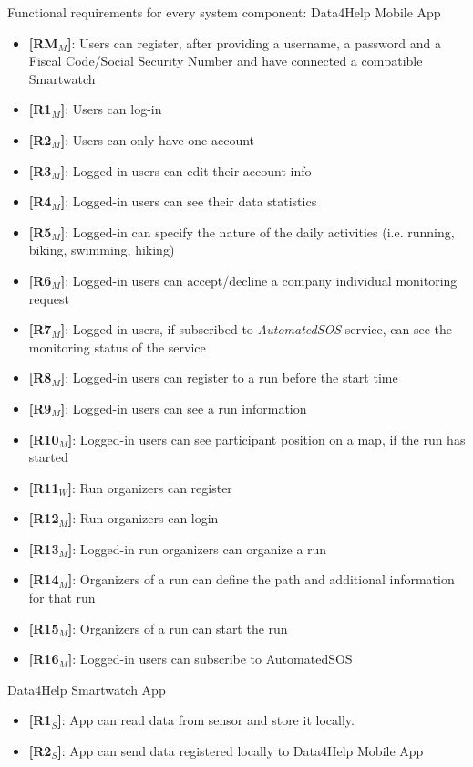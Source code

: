 Functional requirements for every system component:
\newline
Data4Help Mobile App
\begin{itemize}
    \item \textbf{[RM$_M$]}: Users can register, after providing a username, a password and a Fiscal Code/Social Security Number and have connected a compatible Smartwatch
    \item \textbf{[R1$_M$]}: Users can log-in
    \item \textbf{[R2$_M$]}: Users can only have one account 
    \item \textbf{[R3$_M$]}: Logged-in users can edit their account info
    \item \textbf{[R4$_M$]}: Logged-in users can see their data statistics
    \item \textbf{[R5$_M$]}: Logged-in can specify the nature of the daily activities (i.e. running, biking, swimming, hiking)
    \item \textbf{[R6$_M$]}: Logged-in users can accept/decline a company individual monitoring request
    \item \textbf{[R7$_M$]}: Logged-in users, if subscribed to \textit{AutomatedSOS} service, can see the monitoring status of the service
    \item \textbf{[R8$_M$]}: Logged-in users can register to a run before the start time
    \item \textbf{[R9$_M$]}: Logged-in users can see a run information
    \item \textbf{[R10$_M$]}: Logged-in users can see participant position on a map, if the run has started
        \item \textbf{[R11$_W$]}: Run organizers can register
    \item \textbf{[R12$_M$]}: Run organizers can login
    \item \textbf{[R13$_M$]}: Logged-in run organizers can organize a run
    \item \textbf{[R14$_M$]}: Organizers of a run can define the path and additional information for that run
    \item \textbf{[R15$_M$]}: Organizers of a run can start the run
    \item \textbf{[R16$_M$]}: Logged-in users can subscribe to AutomatedSOS
\end{itemize}

\noindent Data4Help Smartwatch App
\begin{itemize}
    \item \textbf{[R1$_S$]}: App can read data from sensor and store it locally.
    \item \textbf{[R2$_S$]}: App can send data registered locally to Data4Help Mobile App
\end{itemize}

